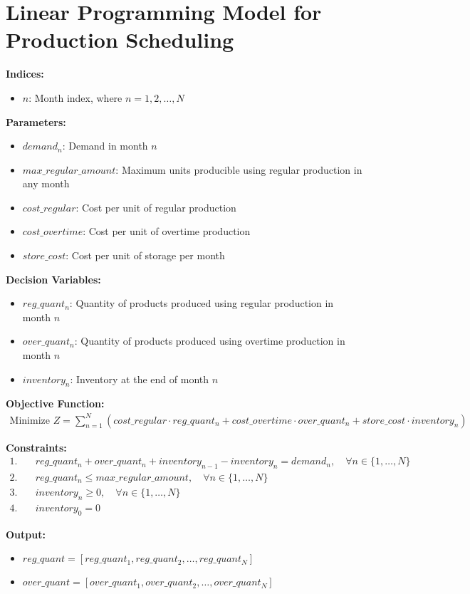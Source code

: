 \documentclass{article}
\begin{document}
\section*{Linear Programming Model for Production Scheduling}

\textbf{Indices:}
\begin{itemize}
    \item $n$: Month index, where $n = 1, 2, \ldots, N$
\end{itemize}

\textbf{Parameters:}
\begin{itemize}
    \item $demand_n$: Demand in month $n$
    \item $max\_regular\_amount$: Maximum units producible using regular production in any month
    \item $cost\_regular$: Cost per unit of regular production
    \item $cost\_overtime$: Cost per unit of overtime production
    \item $store\_cost$: Cost per unit of storage per month
\end{itemize}

\textbf{Decision Variables:}
\begin{itemize}
    \item $reg\_quant_n$: Quantity of products produced using regular production in month $n$
    \item $over\_quant_n$: Quantity of products produced using overtime production in month $n$
    \item $inventory_n$: Inventory at the end of month $n$
\end{itemize}

\textbf{Objective Function:}
\begin{align*}
\text{Minimize } Z = \sum_{n=1}^{N} \left( cost\_regular \cdot reg\_quant_n + cost\_overtime \cdot over\_quant_n + store\_cost \cdot inventory_n \right)
\end{align*}

\textbf{Constraints:}
\begin{align*}
1. & \quad reg\_quant_n + over\_quant_n + inventory_{n-1} - inventory_n = demand_n, \quad \forall n \in \{1, \ldots, N\} \\
2. & \quad reg\_quant_n \leq max\_regular\_amount, \quad \forall n \in \{1, \ldots, N\} \\
3. & \quad inventory_n \geq 0, \quad \forall n \in \{1, \ldots, N\} \\
4. & \quad inventory_0 = 0
\end{align*}

\textbf{Output:}
\begin{itemize}
    \item $reg\_quant = [reg\_quant_1, reg\_quant_2, \ldots, reg\_quant_N]$
    \item $over\_quant = [over\_quant_1, over\_quant_2, \ldots, over\_quant_N]$
\end{itemize}
\end{document}
